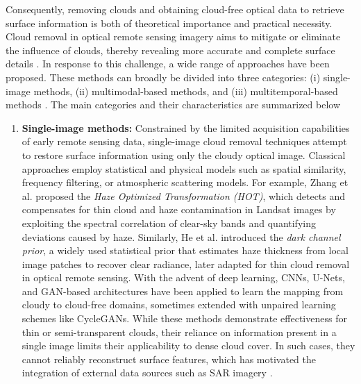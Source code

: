 Consequently, removing clouds and obtaining cloud-free optical data to retrieve surface information is both of theoretical importance and practical necessity. Cloud removal in optical remote sensing imagery aims to mitigate or eliminate the influence of clouds, thereby revealing more accurate and complete surface details \cite{CR_Advances_Review_ORS}. In response to this challenge, a wide range of approaches have been proposed. These methods can broadly be divided into three categories: (i) single-image methods, (ii) multimodal-based methods, and (iii) multitemporal-based methods \cite{CR_Advances_Review_ORS}. The main categories and their characteristics are summarized below

\begin{enumerate}[label=(\Alph*)]
  \item \textbf{Single-image methods:} Constrained by the limited acquisition capabilities of early remote sensing data, single-image cloud removal techniques attempt to restore surface information using only the cloudy optical image. Classical approaches employ statistical and physical models such as spatial similarity, frequency filtering, or atmospheric scattering models. For example, Zhang et al. \cite{single_variation} proposed the \emph{Haze Optimized Transformation (HOT)}, which detects and compensates for thin cloud and haze contamination in Landsat images by exploiting the spectral correlation of clear-sky bands and quantifying deviations caused by haze. Similarly, He et al. \cite{single_haze_removal_dark_prior} introduced the \emph{dark channel prior}, a widely used statistical prior that estimates haze thickness from local image patches to recover clear radiance, later adapted for thin cloud removal in optical remote sensing. With the advent of deep learning, CNNs, U-Nets, and GAN-based architectures have been applied to learn the mapping from cloudy to cloud-free domains, sometimes extended with unpaired learning schemes like CycleGANs. While these methods demonstrate effectiveness for thin or semi-transparent clouds, their reliance on information present in a single image limits their applicability to dense cloud cover. In such cases, they cannot reliably reconstruct surface features, which has motivated the integration of external data sources such as SAR imagery \cite{CR_Advances_Review_ORS}.


\end{enumerate}
